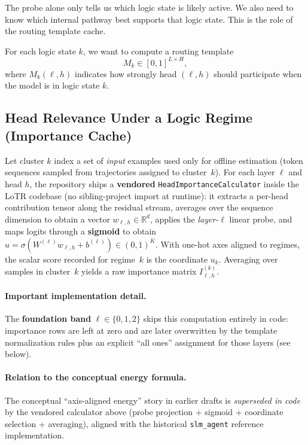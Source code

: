 \documentclass[11pt]{article}
\begin{document}
The probe alone only tells us which logic state is likely active. We also need to know which internal pathway best supports that logic state. This is the role of the routing template cache.

For each logic state $k$, we want to compute a routing template
\[
M_k \in [0,1]^{L\times H},
\]
where $M_k(\ell,h)$ indicates how strongly head $(\ell,h)$ should participate when the model is in logic state $k$.

\subsection{Head Relevance Under a Logic Regime (Importance Cache)}

Let cluster $k$ index a set of \emph{input} examples used only for offline estimation (token sequences sampled from trajectories assigned to cluster~$k$). For each layer $\ell$ and head $h$, the repository ships a \textbf{vendored} \texttt{HeadImportanceCalculator} inside the LoTR codebase (no sibling-project import at runtime): it extracts a per-head contribution tensor along the residual stream, averages over the sequence dimension to obtain a vector $w_{\ell,h}\in\mathbb{R}^d$, applies the \emph{layer-$\ell$} linear probe, and maps logits through a \textbf{sigmoid} to obtain $u=\sigma(W^{(\ell)} w_{\ell,h}+b^{(\ell)})\in(0,1)^K$. With one-hot axes aligned to regimes, the scalar score recorded for regime~$k$ is the coordinate $u_k$. Averaging over samples in cluster~$k$ yields a raw importance matrix $I_{\ell,h}^{(k)}$.

\paragraph{Important implementation detail.}
The \textbf{foundation band} $\ell\in\{0,1,2\}$ skips this computation entirely in code: importance rows are left at zero and are later overwritten by the template normalization rules plus an explicit ``all ones'' assignment for those layers (see below).

\paragraph{Relation to the conceptual energy formula.}
The conceptual ``axis-aligned energy'' story in earlier drafts is \emph{superseded in code} by the vendored calculator above (probe projection + sigmoid + coordinate selection + averaging), aligned with the historical \texttt{slm\_agent} reference implementation.
\end{document}
